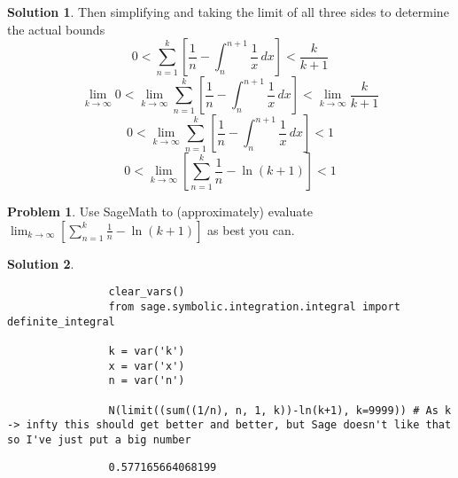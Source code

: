 \documentclass[10pt]{article}
\makeatletter
\theoremstyle{definition}
\newtheorem{problem}{Problem}
\newtheorem{soln}{Solution}
\newcommand{\boxspacing}{\kern\kvtcb@left@rule\kern\kvtcb@boxsep}
\newcommand{\prompt}[4]{
    \ttfamily\llap{{\color{#2}[#3]:\hspace{3pt}#4}}\vspace{-\baselineskip}
}
\makeatother
\begin{document}
\begin{soln}
    \noindent Then simplifying and taking the limit of all three sides to determine the actual bounds
    $$0 < \sum_{n = 1}^{k}\left[ \frac{1}{n} - \int_{n}^{n+1} \frac{1}{x} \,dx\right] < \frac{k}{k+1}$$
    $$\lim_{k \to \infty}0 < \lim_{k \to \infty}\sum_{n = 1}^{k}\left[ \frac{1}{n} - \int_{n}^{n+1} \frac{1}{x} \,dx\right] < \lim_{k \to \infty}\frac{k}{k+1}$$
    $$0 < \lim_{k \to \infty}\sum_{n = 1}^{k}\left[ \frac{1}{n} - \int_{n}^{n+1} \frac{1}{x} \,dx\right] < 1$$
    $$0 < \lim_{k \to \infty} \left[\sum_{n = 1}^{k} \frac{1}{n} - \ln(k+1)\right] < 1$$
\end{soln}

\begin{problem}
Use SageMath to (approximately) evaluate $\lim_{k \to \infty} \left[\sum_{n = 1}^{k} \frac{1}{n} - \ln(k+1)\right]$ as best you can.
\end{problem}
\begin{soln} ~\\
    \begin{tcolorbox}[breakable, size=fbox, boxrule=1pt, pad at break*=1mm,colback=cellbackground, colframe=cellborder]
        \prompt{In}{incolor}{1}{\boxspacing}
        \begin{verbatim}
                clear_vars()
                from sage.symbolic.integration.integral import definite_integral
                
                k = var('k')
                x = var('x')
                n = var('n')
                
                N(limit((sum((1/n), n, 1, k))-ln(k+1), k=9999)) # As k -> infty this should get better and better, but Sage doesn't like that so I've just put a big number
            \end{verbatim}
    \end{tcolorbox}
    \begin{tcolorbox}[breakable, size=fbox, boxrule=.5pt, pad at break*=1mm, opacityfill=0]
        \prompt{Out}{outcolor}{1}{\boxspacing}
        \begin{verbatim}
                0.577165664068199
            \end{verbatim}
    \end{tcolorbox}
\end{soln}
\end{document}
